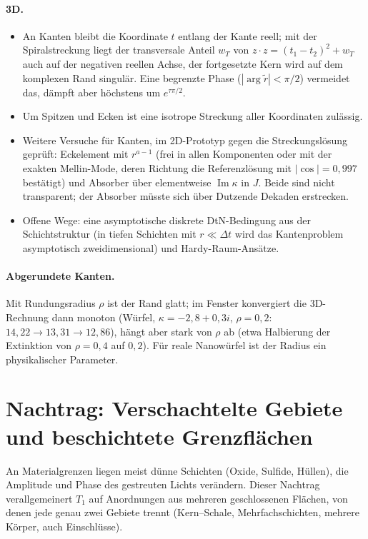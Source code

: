 \documentclass[11pt, a4paper]{article}
\theoremstyle{plain}
\theoremstyle{definition}
\begin{document}
\paragraph{3D.}
\begin{itemize}[leftmargin=*]
  \item An Kanten bleibt die Koordinate $t$ entlang der Kante reell; mit der Spiralstreckung liegt der
    transversale Anteil $w_T$ von $z\cdot z=(t_1-t_2)^2+w_T$ auch auf der negativen reellen Achse, der fortgesetzte
    Kern wird auf dem komplexen Rand singulär. Eine begrenzte Phase ($|\arg\tilde r|<\pi/2$) vermeidet das,
    dämpft aber höchstens um $e^{\tau\pi/2}$.
  \item Um Spitzen und Ecken ist eine isotrope Streckung aller Koordinaten zulässig.
  \item Weitere Versuche für Kanten, im 2D-Prototyp gegen die Streckungslösung geprüft: Eckelement mit
    $r^{a-1}$ (frei in allen Komponenten oder mit der exakten Mellin-Mode, deren Richtung die Referenzlösung mit
    $|\cos|=0{,}997$ bestätigt) und Absorber über elementweise $\operatorname{Im}\kappa$ in $J$. Beide sind nicht
    transparent; der Absorber müsste sich über Dutzende Dekaden erstrecken.
  \item Offene Wege: eine asymptotische diskrete DtN-Bedingung aus der Schichtstruktur (in tiefen Schichten mit
    $r\ll\Delta t$ wird das Kantenproblem asymptotisch zweidimensional) und Hardy-Raum-Ansätze.
\end{itemize}

\paragraph{Abgerundete Kanten.} Mit Rundungsradius $\rho$ ist der Rand glatt; im Fenster konvergiert die
3D-Rechnung dann monoton (Würfel, $\kappa=-2{,}8+0{,}3i$, $\rho=0{,}2$: $14{,}22\to13{,}31\to12{,}86$), hängt
aber stark von $\rho$ ab (etwa Halbierung der Extinktion von $\rho=0{,}4$ auf $0{,}2$). Für reale Nanowürfel ist
der Radius ein physikalischer Parameter.

\section{Nachtrag: Verschachtelte Gebiete und beschichtete Grenzflächen}\label{sec:schicht}

An Materialgrenzen liegen meist dünne Schichten (Oxide, Sulfide, Hüllen), die Amplitude und Phase des gestreuten
Lichts verändern. Dieser Nachtrag verallgemeinert $T_1$ auf Anordnungen aus mehreren geschlossenen Flächen, von
denen jede genau zwei Gebiete trennt (Kern--Schale, Mehrfachschichten, mehrere Körper, auch Einschlüsse).
\end{document}
